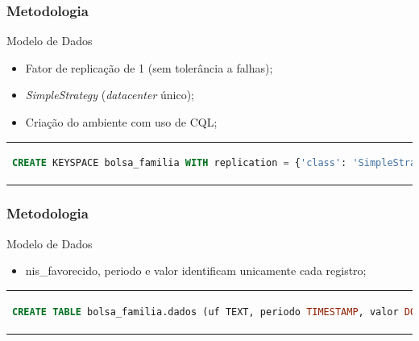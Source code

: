 \documentclass[brazil]{beamer}
\begin{document}
\begin{frame}[fragile]
	\frametitle{Metodologia}
	\begin{block}{Modelo de Dados}
		\begin{itemize}
			\item Fator de replicação de 1 (sem tolerância a falhas);
			\item \emph{SimpleStrategy} (\emph{datacenter} único);
			\item Criação do ambiente com uso de CQL;
		\end{itemize}
	
		\begin{tabular}{c}
		\begin{lstlisting}[caption={Código CQL para criação do keyspace},label={lst:cql_create_table},language=SQL]
		CREATE KEYSPACE bolsa_familia WITH replication = {'class': 'SimpleStrategy', 'replication_factor': 1};
		\end{lstlisting}
		\end{tabular}
	\end{block}
\end{frame}

\begin{frame}[fragile]
	\frametitle{Metodologia}
	\begin{block}{Modelo de Dados}
		\begin{itemize}
			\item nis\_favorecido, periodo e valor identificam unicamente cada registro;
		\end{itemize}
	
		\begin{tabular}{c}
		\begin{lstlisting}[caption={Código CQL para criação da tabela},label={lst:cql_create_table},language=SQL]
			CREATE TABLE bolsa_familia.dados (uf TEXT, periodo TIMESTAMP, valor DOUBLE, nis_favorecido BIGINT, cod_municipio INT, fonte TEXT, nome_favorecido TEXT, nome_municipio TEXT, PRIMARY KEY(nis_favorecido, periodo, valor));
		\end{lstlisting}
		\end{tabular}
	\end{block}
\end{frame}
\end{document}
